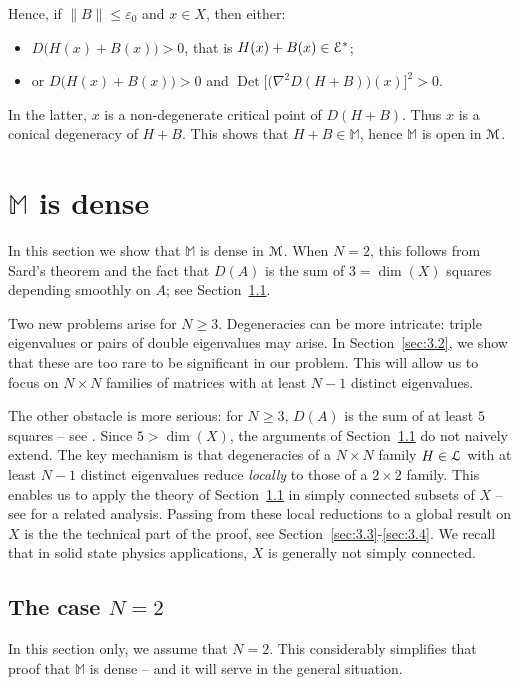 \documentclass[11pt]{article}
\numberwithin{equation}{section}
\let\pazocal\EuScript
\theoremstyle{definition}
\DeclareMathOperator{\Det}{Det}
\newcommand{\EE}{\pazocal{E}}
\newcommand{\MM}{\pazocal{M}}
\newcommand{\LL}{{\pazocal{L}}}
\newcommand{\Mm}{\mathbb{M}}
\let\epsi\varepsilon
\begin{document}
Hence, if $\| B \| \leq \epsi_0$ and $x \in X$, then either:
\begin{itemize}
\item $D \bigl( H(x) + B(x)\bigr) > 0$, that is $H(x) + B(x) \in \EE^*$;
\item or $D \bigl( H(x) + B(x)\bigr) > 0$ and $\Det\bigl[ \bigl(\nabla^2 D(H+B)\bigr)(x) \bigr]^2 >0$.
\end{itemize}
In the latter, $x$ is a non-degenerate critical point of $D(H+B)$. Thus $x$ is a conical degeneracy of $H+B$. This shows that $H+B \in \Mm$, hence $\Mm$ is open in $\MM$.

\section{\texorpdfstring{$\Mm$}{M} is dense}\label{sec:3}

In this section we show that $\Mm$ is dense in $\MM$. When $N = 2$, this follows from Sard's theorem and the fact that $D(A)$ is the sum of $3=\dim(X)$ squares depending smoothly on $A$; see Section~\ref{sec:3.1}.

Two new problems arise for $N \geq 3$. Degeneracies can be more intricate: triple eigenvalues or pairs of double eigenvalues may arise. In Section~\ref{sec:3.2}, we show that these are too rare to be significant in our problem. This will allow us to focus on $N \times N$ families of matrices with at least $N-1$ distinct eigenvalues.

The other obstacle is more serious: for $N \geq 3$, $D(A)$ is the sum of at least $5$ squares -- see \cite{D11}. Since $5 > \dim(X)$, the arguments of Section~\ref{sec:3.1} do not naively extend. The key mechanism is that degeneracies of a $N \times N$ family $H \in \LL$ with at least $N-1$ distinct eigenvalues reduce \textit{locally} to those of a $2 \times 2$ family. This enables us to apply the theory of Section~\ref{sec:3.1} in simply connected subsets of $X$ -- see \cite[\S4]{DP12} for a related analysis. Passing from these local reductions to a global result on $X$ is the the technical part of the proof, see Section~\ref{sec:3.3}-\ref{sec:3.4}. We recall that in solid state physics applications, $X$ is generally not simply connected.

\subsection{The case $N=2$}\label{sec:3.1} In this section only, we assume that $N=2$. This considerably simplifies that proof that $\Mm$ is dense -- and it will serve in the general situation.
\end{document}
